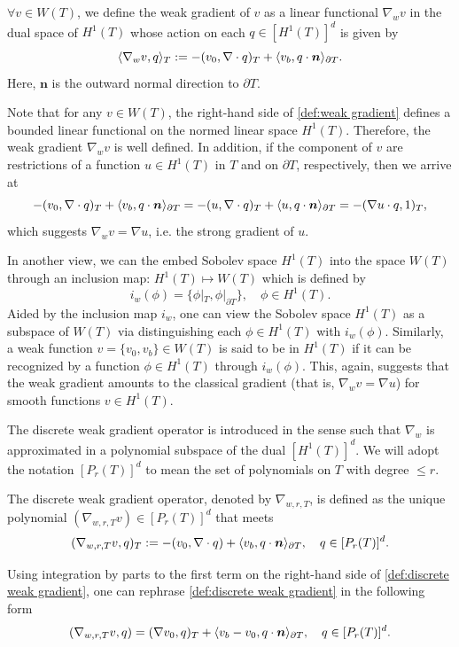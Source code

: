 	\begin{definition}
	$\forall v\in W(T)$, we define the weak gradient of $v$ as a linear 
	functional $\nabla_w v$	in the dual space of $H^1(T)$ whose action on each
	$q\in[H^1(T)]^d$ is given by 
	\begin{equation}\label{def:weak gradient}
		\langle \nabla_w v,q \rangle_T := - (v_0, \nabla\cdot q)_T+
		\langle v_b, q\cdot\bm{n} \rangle_{\partial T}.
	\end{equation}
	Here, $\bm{n}$ is the outward normal direction to $\partial T$.
	\end{definition}

	Note that for any $v\in W(T)$, the right-hand side of 
	\eqref{def:weak gradient} defines a bounded linear functional on the 
	normed linear space $H^1(T)$. Therefore, the weak gradient $\nabla_w v$ 
	is well defined. In addition, if the component of $v$ are restrictions of
	a function $u\in H^1(T)$ in $T$ and on $\partial T$, respectively, then
	we arrive at
	\[-(v_0,\nabla\cdot q)_T + \langle v_b, q\cdot\bm{n} \rangle_{\partial T}=
	-(u,\nabla\cdot q)_T + \langle u, q\cdot\bm{n} \rangle_{\partial T}=
	-(\nabla u\cdot q, 1)_T,\]
	which suggests $\nabla_w v=\nabla u$, i.e. the strong gradient of 
	$u$.
	
	In another view, we can the embed Sobolev space $H^1(T)$ into the space 
	$W(T)$ through an inclusion map: $H^1(T)\mapsto W(T)$ which is defined by
	\[ i_w(\phi) = \{\phi|_T,\phi|_{\partial T}\},\quad \phi\in H^1(T).\]	
	Aided by the inclusion map $i_w$, one can view the Sobolev space $H^1(T)$ 
	as a subspace of $W(T)$ via distinguishing each $\phi\in H^1(T)$ with 
	$i_w(\phi)$. Similarly, a weak function $v=\{v_0,v_b\}\in W(T)$ is said
	to be in $H^1(T)$ if it can be recognized by a function $\phi\in H^1(T)$
	through $i_w(\phi)$. This, again, suggests that 
	the weak gradient amounts to the classical gradient 
	(that is, $\nabla_w v=\nabla u$) for smooth functions $v\in H^1(T)$. 
	
	The discrete weak gradient operator is introduced
	in the sense such that $\nabla_w$ is approximated in a polynomial subspace 
	of the dual $[H^1(T)]^d$. We will 
	adopt the notation $[P_r(T)]^d$ to mean the set of polynomials on $T$ with 
	degree $\leq r$.
	
	\begin{definition}
	The discrete weak gradient operator, denoted by $\nabla_{w,r,T}$, is defined
	as the unique polynomial $(\nabla_{w,r,T}v)\in[P_r(T)]^d$ that meets 
	\begin{equation}\label{def:discrete weak gradient}
		(\nabla_{w,r,T}v,q)_T := -(v_0,\nabla\cdot q)+
		\langle v_b,q\cdot\bm{n} \rangle_{\partial T}, \quad q\in[P_r(T)]^d.
	\end{equation}
	\end{definition}
	Using integration by parts to the first term on the right-hand side of
	\eqref{def:discrete weak gradient}, one can rephrase
	\eqref{def:discrete weak gradient} in the following form
	\begin{equation}\label{eq:rewrite of dwg}
		(\nabla_{w,r,T}v,q)=(\nabla v_0,q)_T+
		\langle v_b-v_0,q\cdot\bm{n} \rangle_{\partial T}, \quad q\in[P_r(T)]^d.		
	\end{equation}

